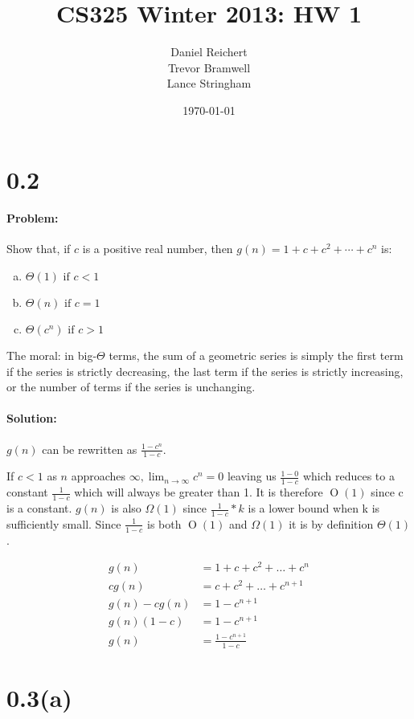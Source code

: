 \documentclass[12pt]{article}
\title{CS325 Winter 2013: HW 1}
\author{
    Daniel Reichert \\
    Trevor Bramwell \\
    Lance Stringham
}
\date{\today}
\newcommand{\BigO}[1]{\ensuremath{\operatorname{O}\left(#1\right)}}
\begin{document}
\maketitle

\section*{0.2}
\paragraph{Problem:}
Show that, if $c$ is a positive real number, then $g(n)=1+c+c^2+\cdots+c^n$ is:

\begin{enumerate}[(a)]
\item $\Theta(1) \text{ if } c < 1$
\item $\Theta(n) \text{ if } c = 1$
\item $\Theta(c^n) \text{ if } c > 1$
\end{enumerate}

The moral: in big-$\Theta$ terms, the sum of a geometric series is simply the
first term if the series is
strictly decreasing, the last term if the series is strictly increasing,
or the number of terms if the
series is unchanging.

\paragraph{Solution:}
$g(n)$ can be rewritten as $\frac{1-c^n}{1-c}$.

If $c < 1$ as $n$ approaches $\infty, \lim_{n \to \infty} c^n = 0$ leaving us
$\frac{1-0}{1-c}$ which reduces to a constant $\frac{1}{1-c}$ which will always
be greater than 1. It is therefore $\BigO{1}$ since c is a constant. $g(n)$ is also
$\Omega(1)$ since $\frac{1}{1-c}*k$ is a lower bound when k is sufficiently small.
Since $\frac{1}{1-c}$ is both $\BigO{1}$ and $\Omega(1)$ it is by
definition $\Theta(1)$.

\begin{align*}
    g(n) &= 1 + c + c^2 + \dots + c^{n} \\
    cg(n) &= c + c^2 + \dots + c^{n+1} \\
    g(n) - cg(n) &= 1 - c^{n+1} \\
    g(n)(1 - c) &= 1 - c^{n+1} \\
    g(n) &= \frac{1 - c^{n+1}}{1 - c}
\end{align*}

\section*{0.3(a)}
\end{document}
